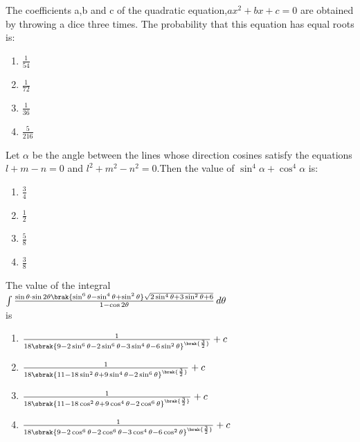 \iffalse
\title{2021}   
\author{AI24Btech11024}
\section{mcq-single}              
\fi
\item The coefficients a,b and c of the quadratic equation,$ax^{2}+bx+c=0$ are obtained by throwing a dice three times. The probability that this equation has equal roots is$\colon$ \hfill{}
\begin{enumerate}
    \item $\frac{1}{54}$
    \item $\frac{1}{72}$
    \item $\frac{1}{36}$
    \item $\frac{5}{216}$
\end{enumerate}
\item Let $\alpha$ be the angle between the lines whose direction cosines satisfy the equations $l+m-n=0$ and $l^{2}+m^{2}-n^{2}=0$.Then the value of $\sin^{4}\alpha+\cos^{4}\alpha$ is$\colon$ \hfill{}
\begin{enumerate}
    \item $\frac{3}{4}$
    \item $\frac{1}{2}$
    \item $\frac{5}{8}$
    \item $\frac{3}{8}$
\end{enumerate}
\item The value of the integral\\
$\int \frac{\sin \theta \cdot \sin 2\theta \brak{ \sin^{6} \theta - \sin^{4} \theta + \sin^{2} \theta } \sqrt{2 \sin^{4} \theta + 3 \sin^{2} \theta + 6}}{1 - \cos 2\theta} \, d\theta$\\is \hfill{}
\begin{enumerate}
    \item $\frac{1}{18\sbrak{9-2\sin^{6}\theta-2\sin^{6}\theta-3\sin^{4}\theta-6\sin^{2}\theta}^{\brak{\frac{3}{2}}}}+c$
    \item $\frac{1}{18\sbrak{11-18\sin^{2}\theta+9\sin^{4}\theta-2\sin^{6}\theta}^{\brak{\frac{3}{2}}}}+c$
    \item $\frac{1}{18\sbrak{11-18\cos^{2}\theta+9\cos^{4}\theta-2\cos^{6}\theta}^{\brak{\frac{3}{2}}}}+c$
    \item $\frac{1}{18\sbrak{9-2\cos^{6}\theta-2\cos^{6}\theta-3\cos^{4}\theta-6\cos^{2}\theta}^{\brak{\frac{3}{2}}}}+c$
\end{enumerate}
